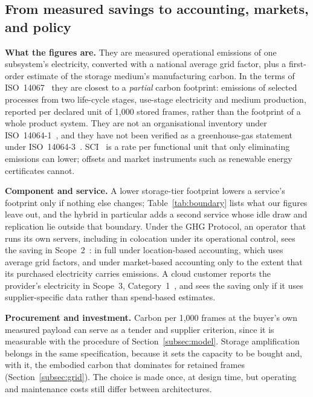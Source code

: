 \documentclass[pdflatex,sn-basic]{sn-jnl}%
\begin{document}
\subsection{{\color{markup}From measured savings to accounting, markets, and policy}}\label{subsec:accounting}
{\color{markup}\textbf{What the figures are.} They are measured operational emissions of one subsystem's electricity, converted with a national average grid factor, plus a first-order estimate of the storage medium's manufacturing carbon.} {\color{markup}In the terms of ISO~14067~\citep{iso_14067_cfp} they are closest to a \emph{partial} carbon footprint: emissions of selected processes from two life-cycle stages, use-stage electricity and medium production, reported per declared unit of 1{,}000 stored frames, rather than the footprint of a whole product system.} {\color{markup}They are not an organisational inventory under ISO~14064-1~\citep{iso_14064_1_inventory}, and they have not been verified as a greenhouse-gas statement under ISO~14064-3~\citep{iso_14064_3_verification}.} {\color{markup}SCI~\citep{gsf_sci,iso_iec_21031_sci} is a rate per functional unit that only eliminating emissions can lower; offsets and market instruments such as renewable energy certificates cannot.}

{\color{markup}\textbf{Component and service.} A lower storage-tier footprint lowers a service's footprint only if nothing else changes; Table~\ref{tab:boundary} lists what our figures leave out, and the hybrid in particular adds a second service whose idle draw and replication lie outside that boundary.} {\color{markup}Under the GHG Protocol, an operator that runs its own servers, including in colocation under its operational control, sees the saving in Scope~2~\citep{ghgp_scope2_guidance}: in full under location-based accounting, which uses average grid factors, and under market-based accounting only to the extent that its purchased electricity carries emissions.} {\color{markup}A cloud customer reports the provider's electricity in Scope~3, Category~1~\citep{ghgp_scope3_standard}, and sees the saving only if it uses supplier-specific data rather than spend-based estimates.}

{\color{markup}\textbf{Procurement and investment.} Carbon per 1{,}000 frames at the buyer's own measured payload can serve as a tender and supplier criterion, since it is measurable with the procedure of Section~\ref{subsec:model}.} {\color{markup}Storage amplification belongs in the same specification, because it sets the capacity to be bought and, with it, the embodied carbon that dominates for retained frames (Section~\ref{subsec:grid}).} {\color{markup}The choice is made once, at design time, but operating and maintenance costs still differ between architectures.}
\end{document}
